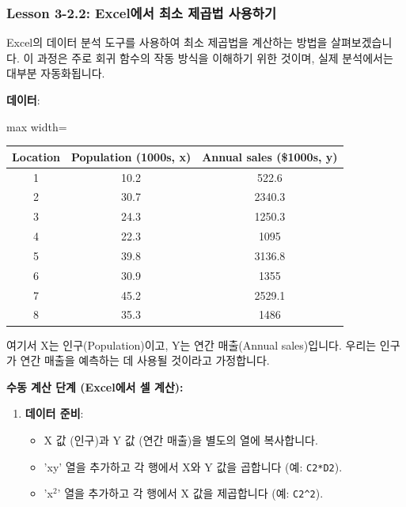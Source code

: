 \documentclass[11pt,a4paper]{book}
\theoremstyle{definition}
\begin{document}
\subsubsection{Lesson 3-2.2: Excel에서 최소 제곱법 사용하기}

Excel의 데이터 분석 도구를 사용하여 최소 제곱법을 계산하는 방법을 살펴보겠습니다. 이 과정은 주로 회귀 함수의 작동 방식을 이해하기 위한 것이며, 실제 분석에서는 대부분 자동화됩니다.

\begin{tcolorbox}[examplebox, title={Excel 실습: 인구 및 매출 데이터}]
\textbf{데이터}:
\begin{adjustbox}{max width=\textwidth}
\begin{tabular}{ccc}
\toprule
\textbf{Location} & \textbf{Population (1000s, x)} & \textbf{Annual sales (\$1000s, y)} \\
\midrule
1 & 10.2 & 522.6 \\
2 & 30.7 & 2340.3 \\
3 & 24.3 & 1250.3 \\
4 & 22.3 & 1095 \\
5 & 39.8 & 3136.8 \\
6 & 30.9 & 1355 \\
7 & 45.2 & 2529.1 \\
8 & 35.3 & 1486 \\
\bottomrule
\end{tabular}
\end{adjustbox}
여기서 X는 인구(Population)이고, Y는 연간 매출(Annual sales)입니다. 우리는 인구가 연간 매출을 예측하는 데 사용될 것이라고 가정합니다.

\textbf{수동 계산 단계 (Excel에서 셀 계산):}
\begin{enumerate}[label=\arabic*.]
    \item \textbf{데이터 준비}:
    \begin{itemize}
        \item X 값 (인구)과 Y 값 (연간 매출)을 별도의 열에 복사합니다.
        \item 'xy' 열을 추가하고 각 행에서 X와 Y 값을 곱합니다 (예: \texttt{C2*D2}).
        \item 'x$^2$' 열을 추가하고 각 행에서 X 값을 제곱합니다 (예: \texttt{C2^2}).
    \end{itemize}


\end{enumerate}
\end{tcolorbox}
\end{document}
